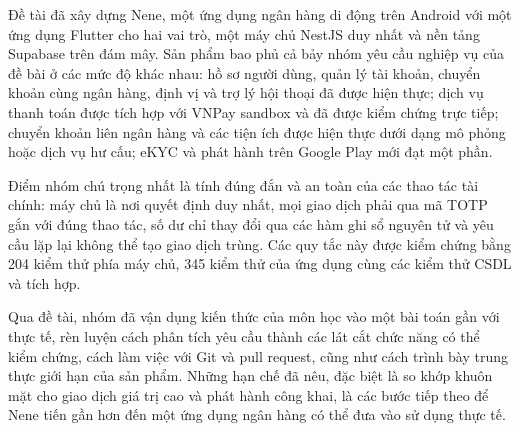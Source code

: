 Đề tài đã xây dựng Nene, một ứng dụng ngân hàng di động trên Android với một ứng dụng Flutter cho hai vai trò, một máy chủ NestJS duy nhất và nền tảng Supabase trên đám mây. Sản phẩm bao phủ cả bảy nhóm yêu cầu nghiệp vụ của đề bài ở các mức độ khác nhau: hồ sơ người dùng, quản lý tài khoản, chuyển khoản cùng ngân hàng, định vị và trợ lý hội thoại đã được hiện thực; dịch vụ thanh toán được tích hợp với VNPay sandbox và đã được kiểm chứng trực tiếp; chuyển khoản liên ngân hàng và các tiện ích được hiện thực dưới dạng mô phỏng hoặc dịch vụ hư cấu; eKYC và phát hành trên Google Play mới đạt một phần.

Điểm nhóm chú trọng nhất là tính đúng đắn và an toàn của các thao tác tài chính: máy chủ là nơi quyết định duy nhất, mọi giao dịch phải qua mã TOTP gắn với đúng thao tác, số dư chỉ thay đổi qua các hàm ghi sổ nguyên tử và yêu cầu lặp lại không thể tạo giao dịch trùng. Các quy tắc này được kiểm chứng bằng 204 kiểm thử phía máy chủ, 345 kiểm thử của ứng dụng cùng các kiểm thử CSDL và tích hợp.

Qua đề tài, nhóm đã vận dụng kiến thức của môn học vào một bài toán gần với thực tế, rèn luyện cách phân tích yêu cầu thành các lát cắt chức năng có thể kiểm chứng, cách làm việc với Git và pull request, cũng như cách trình bày trung thực giới hạn của sản phẩm. Những hạn chế đã nêu, đặc biệt là so khớp khuôn mặt cho giao dịch giá trị cao và phát hành công khai, là các bước tiếp theo để Nene tiến gần hơn đến một ứng dụng ngân hàng có thể đưa vào sử dụng thực tế.
